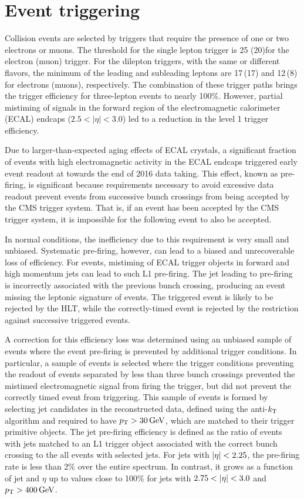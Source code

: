 \section{Event triggering}

Collision events are selected by triggers that require the presence of
one or two electrons or muons.
The \pt threshold for the single lepton trigger is 25 (20)\GeV for the electron (muon) trigger.
For the dilepton triggers, with the same or different flavors, the minimum \pt of the leading and subleading leptons are 17\,(17) and 12\,(8)\GeV
for electrons (muons), respectively.
The combination of these trigger paths brings the trigger efficiency for three-lepton events
to nearly 100\%.
However, partial mistiming of signals in the forward region of the electromagnetic calorimeter (ECAL) endcaps
($2.5 < \left|\eta\right| < 3.0$) led to a reduction in the level 1 trigger efficiency. 

Due to larger-than-expected aging effects of ECAL crystals,
a significant fraction of events
with high electromagnetic activity in the ECAL endcaps triggered 
early event readout at towards the end of 2016 data taking. 
This effect, known as pre-firing, is significant because requirements necessary
to avoid excessive data readout prevent events from successive bunch crossings
from being accepted by the CMS trigger system. 
That is, if an event has been accepted by the CMS trigger
system, it is impossible for the following event to also be accepted.

In normal conditions, the inefficiency due to this requirement is very small
and unbiased. Systematic pre-firing, however, can lead to a biased and unrecoverable
loss of efficiency.
For \EWWZ events, mistiming of ECAL trigger objects in
forward and high momentum jets can lead to such L1 pre-firing.
The jet leading to pre-firing is incorrectly associated with the previous bunch
crossing, producing an event missing the leptonic signature of \WZ events.
The triggered event is likely to be rejected by the HLT, while the correctly-timed
event is rejected by the restriction against successive triggered events.

A correction for this efficiency loss was determined using an unbiased sample
of events where the event pre-firing is prevented by additional trigger conditions.
In particular, a sample of events is selected where the trigger conditions
preventing the readout of events separated by less than three bunch crossings 
prevented the mistimed electromagnetic
signal from firing the trigger, but did not prevent the correctly timed event
from triggering. This sample of events is formed by selecting 
jet candidates in the reconstructed data, defined 
using the anti-$k_{\mathrm{T}}$ algorithm and required to have $p_{\mathrm{T}} > 30\,\text{Ge\hspace{-.08em}V}$,
which are matched to their trigger primitive objects.
The jet pre-firing efficiency is defined as the ratio of events with jets
matched to an L1 trigger object associated with the correct bunch crossing 
to the all events with selected jets. 
For jets with $\lvert \eta \rvert < 2.25$, the pre-firing rate is less than 2\% 
over the entire \pt spectrum. In contrast, it
grows as a function of jet \pt and $\eta$ up to values close to 100\% 
for jets with $2.75 < \lvert \eta \rvert < 3.0$ and $p_{\mathrm{T}} > 400\,\text{Ge\hspace{-.08em}V}$.

